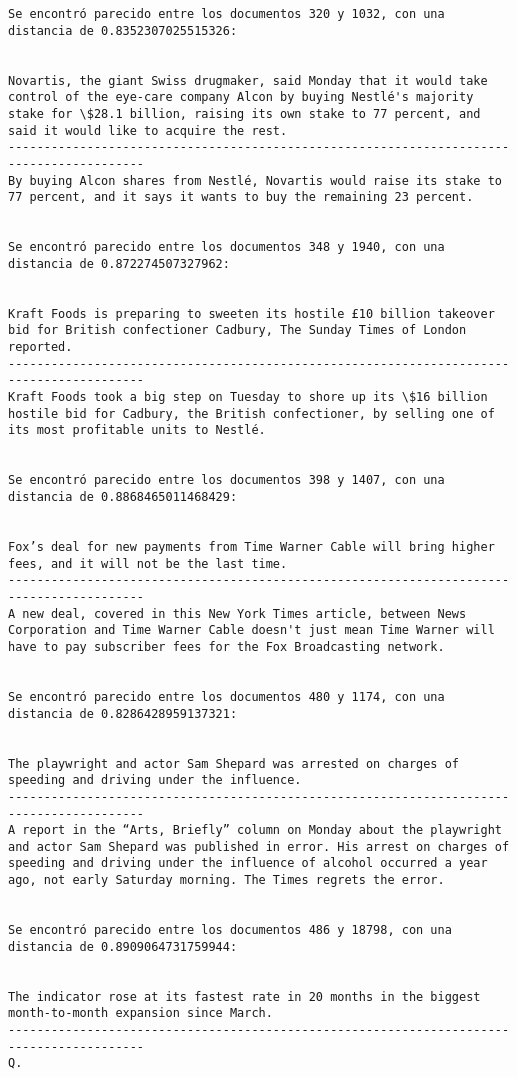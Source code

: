 \documentclass[11pt]{article}
\begin{document}
\begin{Verbatim}[commandchars=\\\{\}]
Se encontró parecido entre los documentos 320 y 1032, con una distancia de 0.8352307025515326:


Novartis, the giant Swiss drugmaker, said Monday that it would take control of the eye-care company Alcon by buying Nestlé's majority stake for \$28.1 billion, raising its own stake to 77 percent, and said it would like to acquire the rest.
-----------------------------------------------------------------------------------------
By buying Alcon shares from Nestlé, Novartis would raise its stake to 77 percent, and it says it wants to buy the remaining 23 percent.


Se encontró parecido entre los documentos 348 y 1940, con una distancia de 0.872274507327962:


Kraft Foods is preparing to sweeten its hostile £10 billion takeover bid for British confectioner Cadbury, The Sunday Times of London reported.
-----------------------------------------------------------------------------------------
Kraft Foods took a big step on Tuesday to shore up its \$16 billion hostile bid for Cadbury, the British confectioner, by selling one of its most profitable units to Nestlé.


Se encontró parecido entre los documentos 398 y 1407, con una distancia de 0.8868465011468429:


Fox’s deal for new payments from Time Warner Cable will bring higher fees, and it will not be the last time.
-----------------------------------------------------------------------------------------
A new deal, covered in this New York Times article, between News Corporation and Time Warner Cable doesn't just mean Time Warner will have to pay subscriber fees for the Fox Broadcasting network.


Se encontró parecido entre los documentos 480 y 1174, con una distancia de 0.8286428959137321:


The playwright and actor Sam Shepard was arrested on charges of speeding and driving under the influence.
-----------------------------------------------------------------------------------------
A report in the “Arts, Briefly” column on Monday about the playwright and actor Sam Shepard was published in error. His arrest on charges of speeding and driving under the influence of alcohol occurred a year ago, not early Saturday morning. The Times regrets the error.


Se encontró parecido entre los documentos 486 y 18798, con una distancia de 0.8909064731759944:


The indicator rose at its fastest rate in 20 months in the biggest month-to-month expansion since March.
-----------------------------------------------------------------------------------------
Q.



\end{Verbatim}
\end{document}
